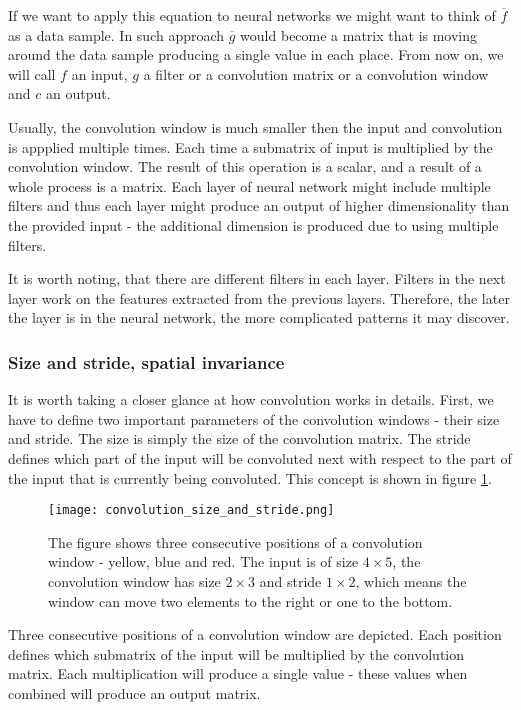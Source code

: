 \documentclass[a4paper,10pt]{report}
\begin{document}
	  If we want to apply this equation to neural networks we might want to think of $\overline{f}$ as a data sample. In such approach $\overline{g}$ would become a matrix that is moving around the data sample producing a single value in each place. From now on, we will call $f$ an input, $g$ a filter or a convolution matrix or a convolution window and $c$ an output. 
	  
	  Usually, the convolution window is much smaller then the input and convolution is appplied multiple times. Each time a  submatrix of input is multiplied by the convolution window. The result of this operation is a scalar, and a result of a whole process is a matrix. Each layer of neural network might include multiple filters and thus each layer might produce an output of higher dimensionality than the provided input - the additional dimension is produced due to using multiple filters. 
	  
	  It is worth noting, that there are different filters in each layer. Filters in the next layer work on the features extracted from the previous layers. Therefore, the later the layer is in the neural network, the more complicated patterns it may discover. 
	  
	  \subsubsection{Size and stride, spatial invariance}
	  
	  It is worth taking a closer glance at how convolution works in details. First, we have to define two important parameters of the convolution windows - their size and stride. The size is simply the size of the convolution matrix. The stride defines which part of the input will be convoluted next with respect to the part of the input that is currently being convoluted. This concept is shown in figure \ref{fig:convolution_size_and_stride}. 
	  
	  
	  \begin{figure}[h!]
	    \centering
	    \texttt{[image: convolution\_size\_and\_stride.png]}
	    \caption{The figure shows three consecutive positions of a convolution window - yellow, blue and red. The input is of size $4\times5$, the convolution window has size $2\times3$ and stride $1\times2$, which means the window can move two elements to the right or one to the bottom.}
	    \label{fig:convolution_size_and_stride}
	  \end{figure} 
	  
	  Three consecutive positions of a convolution window are depicted. Each position defines which submatrix of the input will be multiplied by the convolution matrix. Each multiplication will produce a single value - these values when combined will produce an output matrix. 
	  
\end{document}
